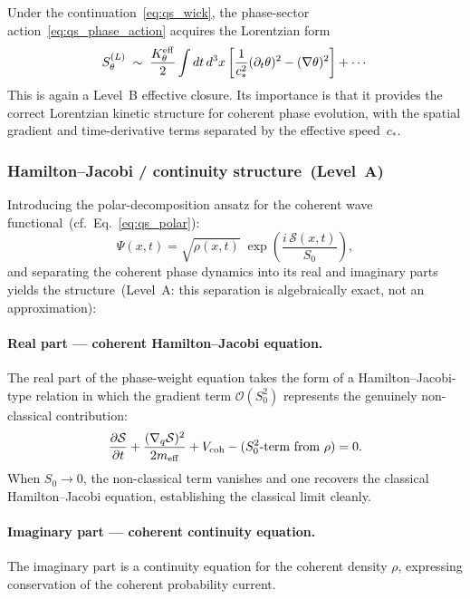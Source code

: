 \documentclass[11pt,a4paper]{article}
\numberwithin{equation}{section}
\begin{document}
Under the continuation~\eqref{eq:qs_wick}, the phase-sector
action~\eqref{eq:qs_phase_action} acquires the Lorentzian form
\begin{equation}
  \label{eq:qs_phase_action_L}
  S_\theta^{(L)}
  \;\sim\;
  \frac{K_\theta^{\rm eff}}{2}
  \int dt\,d^3x
  \left[
    \frac{1}{c_*^2}(\partial_t\theta)^2
    - (\nabla\theta)^2
  \right]
  + \cdots
\end{equation}
This is again a Level~B effective closure.
Its importance is that it provides the correct Lorentzian kinetic
structure for coherent phase evolution, with the spatial gradient and
time-derivative terms separated by the effective speed~$c_*$.

\subsubsection*{Hamilton--Jacobi / continuity structure~(Level~A)}

Introducing the polar-decomposition ansatz for the coherent wave
functional~(cf.~Eq.~\eqref{eq:qs_polar}):
\begin{equation}
  \label{eq:qs_wave_ansatz}
  \Psi(x,t)
  =
  \sqrt{\rho(x,t)}\;
  \exp\!\left(\frac{i\,\mathcal{S}(x,t)}{S_0}\right),
\end{equation}
and separating the coherent phase dynamics into its real and imaginary
parts yields the structure~(Level~A: this separation is algebraically
exact, not an approximation):

\paragraph{Real part --- coherent Hamilton--Jacobi equation.}
The real part of the phase-weight equation takes the form of a
Hamilton--Jacobi-type relation in which the gradient term
$\mathcal{O}(S_0^2)$ represents the genuinely non-classical
contribution:
\begin{equation}
  \label{eq:qs_HJ_structure}
  \frac{\partial\mathcal{S}}{\partial t}
  +
  \frac{(\nabla_q\mathcal{S})^2}{2m_{\rm eff}}
  + V_{\rm coh}
  - (S_0^2\text{-term from } \rho)
  = 0.
\end{equation}
When $S_0\to0$, the non-classical term vanishes and one recovers the
classical Hamilton--Jacobi equation, establishing the classical limit
cleanly.

\paragraph{Imaginary part --- coherent continuity equation.}
The imaginary part is a continuity equation for the coherent density
$\rho$, expressing conservation of the coherent probability current.
\end{document}
